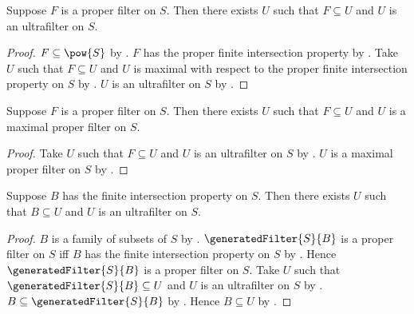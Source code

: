 \begin{theorem}\label{filter_extension_to_ultrafilter}
    Suppose $F$ is a proper filter on $S$.
    Then there exists $U$ such that $F\subseteq U$ and
        $U$ is an ultrafilter on $S$.
\end{theorem}
\begin{proof}
    $F\subseteq\pow{S}$ by .
    $F$ has the proper finite intersection property by
        .
    Take $U$ such that $F\subseteq U$ and
        $U$ is maximal with respect to the proper finite intersection property on $S$
        by .
    $U$ is an ultrafilter on $S$ by .
\end{proof}

\begin{corollary}\label{filter_extension_to_maximal_proper_filter}
    Suppose $F$ is a proper filter on $S$.
    Then there exists $U$ such that $F\subseteq U$ and
        $U$ is a maximal proper filter on $S$.
\end{corollary}
\begin{proof}
    Take $U$ such that $F\subseteq U$ and $U$ is an ultrafilter on $S$
        by .
    $U$ is a maximal proper filter on $S$ by .
\end{proof}

\begin{theorem}\label{hosted_fip_extension_to_ultrafilter}
    Suppose $B$ has the finite intersection property on $S$.
    Then there exists $U$ such that $B\subseteq U$ and
        $U$ is an ultrafilter on $S$.
\end{theorem}
\begin{proof}
    $B$ is a family of subsets of $S$ by
        .
    $\generatedFilter{S}{B}$ is a proper filter on $S$ iff
        $B$ has the finite intersection property on $S$ by
        .
    Hence $\generatedFilter{S}{B}$ is a proper filter on $S$.
    Take $U$ such that $\generatedFilter{S}{B}\subseteq U$ and
        $U$ is an ultrafilter on $S$ by
        .
    $B\subseteq\generatedFilter{S}{B}$ by
        .
    Hence $B\subseteq U$ by .
\end{proof}
